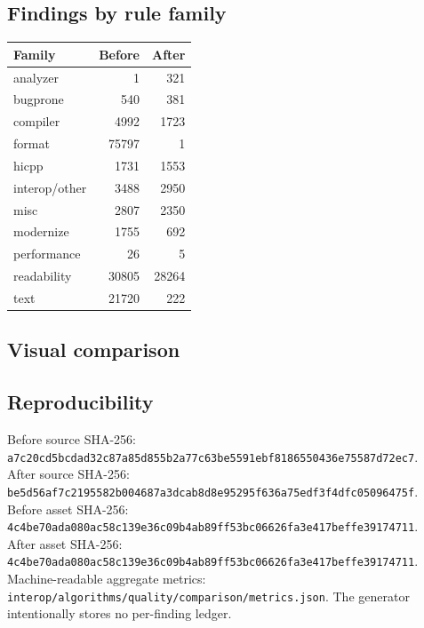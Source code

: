 \documentclass[10pt]{article}
\begin{document}
\subsection*{Findings by rule family}
\begin{tabular}{lrr}
\toprule Family & Before & After \\
\midrule
analyzer & 1 & 321 \\
bugprone & 540 & 381 \\
compiler & 4992 & 1723 \\
format & 75797 & 1 \\
hicpp & 1731 & 1553 \\
interop/other & 3488 & 2950 \\
misc & 2807 & 2350 \\
modernize & 1755 & 692 \\
performance & 26 & 5 \\
readability & 30805 & 28264 \\
text & 21720 & 222 \\
\bottomrule
\end{tabular}
\subsection*{Visual comparison}
\begin{center}
\end{center}
\subsection*{Reproducibility}
Before source SHA-256: \texttt{a7c20cd5bcdad32c87a85d855b2a77c63be5591ebf8186550436e75587d72ec7}.\\
After source SHA-256: \texttt{be5d56af7c2195582b004687a3dcab8d8e95295f636a75edf3f4dfc05096475f}.\\
Before asset SHA-256: \texttt{4c4be70ada080ac58c139e36c09b4ab89ff53bc06626fa3e417beffe39174711}.\\
After asset SHA-256: \texttt{4c4be70ada080ac58c139e36c09b4ab89ff53bc06626fa3e417beffe39174711}.\\
Machine-readable aggregate metrics: \texttt{interop/algorithms/quality/comparison/metrics.json}.
The generator intentionally stores no per-finding ledger.
\end{document}
